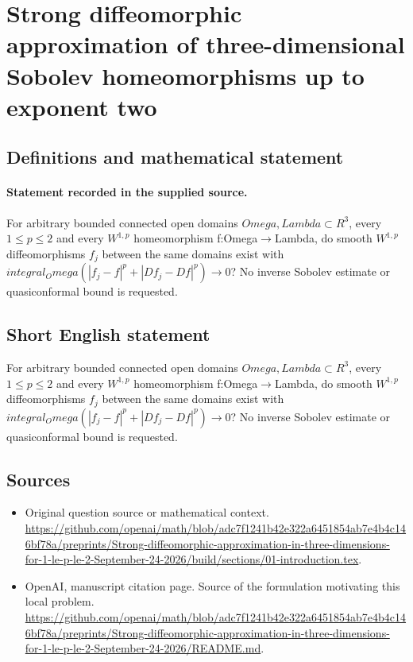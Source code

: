 \documentclass[11pt]{article}
\begin{document}
\section*{Strong diffeomorphic approximation of three-dimensional Sobolev homeomorphisms up to exponent two}\label{statement}
\subsection{Definitions and mathematical statement}
\paragraph{Statement recorded in the supplied source.}
For arbitrary bounded connected open domains $Omega,Lambda\subset R^3$, every $1\leq p\leq 2$ and every $W^{1,p}$ homeomorphism f:Omega$\to$Lambda, do smooth $W^{1,p}$ diffeomorphisms $f_j$ between the same domains exist with $integral_Omega(|f_j-f|^p+|Df_j-Df|^p)\to 0$? No inverse Sobolev estimate or quasiconformal bound is requested.
\subsection{Short English statement}
For arbitrary bounded connected open domains $Omega,Lambda\subset R^3$, every $1\leq p\leq 2$ and every $W^{1,p}$ homeomorphism f:Omega$\to$Lambda, do smooth $W^{1,p}$ diffeomorphisms $f_j$ between the same domains exist with $integral_Omega(|f_j-f|^p+|Df_j-Df|^p)\to 0$? No inverse Sobolev estimate or quasiconformal bound is requested.
\subsection{Sources}
\begin{itemize}
\item[S1] Original question source or mathematical context.
\url{https://github.com/openai/math/blob/adc7f1241b42e322a6451854ab7e4b4c146bf78a/preprints/Strong-diffeomorphic-approximation-in-three-dimensions-for-1-le-p-le-2-September-24-2026/build/sections/01-introduction.tex}.
\item[S2] OpenAI, manuscript citation page. Source of the formulation motivating this local problem.
\url{https://github.com/openai/math/blob/adc7f1241b42e322a6451854ab7e4b4c146bf78a/preprints/Strong-diffeomorphic-approximation-in-three-dimensions-for-1-le-p-le-2-September-24-2026/README.md}.
\end{itemize}
\end{document}
